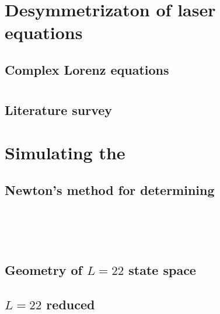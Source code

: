 \chapter{Desymmetrizaton of laser equations}
\label{chap:lasers}

 \section{Complex Lorenz equations}
    \label{sec:CLe}
    

\chapter{\KSe}
\label{chap:KSe}
    \section{\KSe}
    \label{sec:KSe}
    
    \section{Literature survey}
        \label{sec:KSlit}
        


\chapter{Simulating the \KSe}
\label{chap:Numerics}
    \section{Newton's method for determining \reqva}
        


\chapter{\KS\ \statesp}
\label{chap:ksStSp}
    \section{Geometry of $L=22$ state space}
    \label{sec:L22}
    
    \section{$L=22$ reduced \statesp}
    



